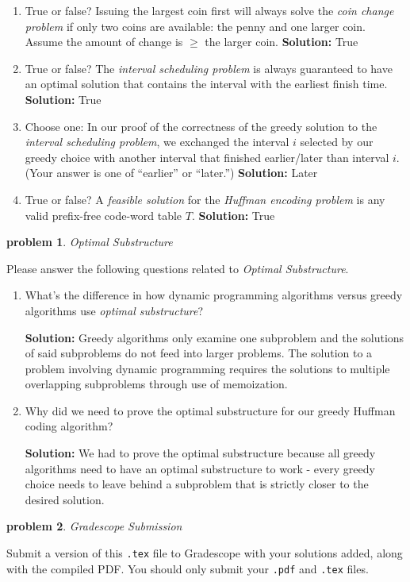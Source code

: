 \documentclass[10pt]{article}
\newcommand{\solution}[1]{\color{blue}\hfill\break\noindent\textbf{Solution:} #1\color{black}}
\newtheorem{problem}{\sc\color{cit}problem}
\begin{document}
\begin{enumerate}
\renewcommand{\theenumi}{\Alph{enumi}}

\item True or false? Issuing the largest coin first will always solve the \emph{coin change problem} if only two coins are available: the penny and one larger coin. Assume the amount of change is $\geq$ the larger coin.
\solution{
    True
}

\item True or false? The \emph{interval scheduling problem} is always guaranteed to have an optimal solution that contains the interval with the earliest finish time.
\solution{
    True
}

\item Choose one: In our proof of the correctness of the greedy solution to the \emph{interval scheduling problem}, we exchanged the interval $i$ selected by our greedy choice with another interval that finished earlier/later than interval $i$. (Your answer is one of ``earlier'' or ``later.'')
\solution{
    Later
}

\item True or false? A \emph{feasible solution} for the \emph{Huffman encoding problem} is any valid prefix-free code-word table $T$.
\solution{
    True
}
\end{enumerate}


\begin{problem}Optimal Substructure\end{problem}
Please answer the following questions related to \emph{Optimal Substructure}.

\begin{enumerate}
\renewcommand{\theenumi}{\Alph{enumi}}

    \item What's the difference in how dynamic programming algorithms versus greedy algorithms use \emph{optimal substructure}?
    
    \solution{
    Greedy algorithms only examine one subproblem and the solutions of said subproblems do not feed into larger problems. The solution to a problem involving dynamic programming requires the solutions to multiple overlapping subproblems through use of memoization.
    }
    \item Why did we need to prove the optimal substructure for our greedy Huffman coding algorithm?

    \solution{
    We had to prove the optimal substructure because all greedy algorithms need to have an optimal substructure to work - every greedy choice needs to leave behind a subproblem that is strictly closer to the desired solution.
    }
\end{enumerate}

\begin{problem} Gradescope Submission \end{problem}

Submit a version of this \verb|.tex| file to Gradescope with your solutions added, along with the compiled PDF.  You should only submit your \verb|.pdf| and \verb|.tex| files.
\end{document}
